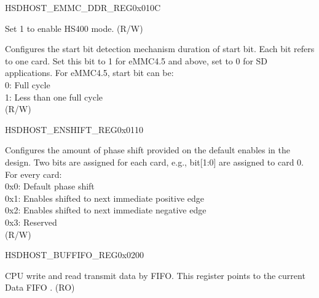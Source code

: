 \begin{register}{H}{SDHOST\_EMMC\_DDR\_REG}{0x{}010C}\label{regdesc:EMMCDDRREG}
%
%
%
\regnewline%
\begin{regdesc}\begin{reglist}
\item [SDHOST\_HS400\_MODE\_REG] Set 1 to enable HS400 mode. (R/W)\\
\item [SDHOST\_HALFSTARTBIT\_REG] Configures the start bit detection mechanism duration of start bit. Each bit refers to one card. Set this bit to 1 for eMMC4.5 and above, set to 0 for SD applications. For eMMC4.5, start bit can be:\\
0: Full cycle\\
1: Less than one full cycle\\(R/W)
\end{reglist}\end{regdesc}
\end{register}

\begin{register}{H}{SDHOST\_ENSHIFT\_REG}{0x{}0110}\label{regdesc:ENSHIFTREG}
%
%
\regnewline%
\begin{regdesc}\begin{reglist}
\item [SDHOST\_ENABLE\_SHIFT\_REG]Configures the amount of phase shift provided on the default enables in the design. Two bits are assigned for each card, e.g., bit[1:0] are assigned to card 0. For every card:\\
0x0: Default phase shift\\
0x1: Enables shifted to next immediate positive edge\\
0x2: Enables shifted to next immediate negative edge\\
0x3: Reserved\\(R/W)
\end{reglist}\end{regdesc}
\end{register}

\begin{register}{H}{SDHOST\_BUFFIFO\_REG}{0x{}0200}\label{regdesc:BUFFIFOREG}
%
\regnewline%
\begin{regdesc}\begin{reglist}
\item [SDHOST\_BUFFIFO\_REG]CPU write and read transmit data by FIFO. This register points to the current Data FIFO . (RO)
\end{reglist}\end{regdesc}
\end{register}

